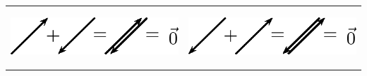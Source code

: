         \begin{center}
      
      \label{m38813*id188732}
      
    \noindent
      \tablelasttail{}
      \begin{xtabular*}{\mytablewidth}[t]{|p{10\mystarwidth}|p{10\mystarwidth}|}\hline
    
    
        
                  
    \setcounter{subfigure}{0}

\label{m38813*id188740}
    \begin{center}
    \label{m38813*id188740!!!underscore!!!media}\label{m38813*id188740!!!underscore!!!printimage}\includegraphics[width=300px]{col11305.imgs/m38813_PG11C1_024.png} %
        
      \vspace{2pt}
    \vspace{.1in}
    
    \end{center}



    \addtocounter{footnote}{-0}
    
                 &
    
    
        
                  
    \setcounter{subfigure}{0}

\label{m38813*id188750}
    \begin{center}
    \label{m38813*id188750!!!underscore!!!media}\label{m38813*id188750!!!underscore!!!printimage}\includegraphics[width=300px]{col11305.imgs/m38813_PG11C1_025.png} %
        

\end{center}
\end{xtabular*}
\end{center}
